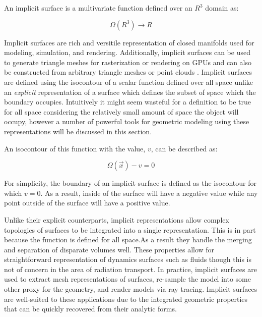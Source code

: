 \documentclass[12pt, a4paper]{article}
\begin{document}
An implicit surface is a multivariate function defined over an $ R^3 $ domain as:

\begin{equation}
    \Omega(R^3)\rightarrow R
\end{equation}


Implicit surfaces are rich and versitile representation of closed manifolds used for modeling, simulation, and rendering. Additionally, implicit surfaces can be used to generate triangle meshes for rasterization or rendering on GPUs \cite{Sethian_1996} and can also be constructed from arbitrary triangle meshes or point clouds \cite{Sigg_2006}. Implicit surfaces are defined using the isocontour of a scalar function defined over all space unlike an \textit{explicit} representation of a surface which defines the subset of space which the boundary occupies. Intuitively it might seem wasteful for a definition to be true for all space considering the relatively small amount of space the object will occupy, however a number of powerful tools for geometric modeling using these representations will be discussed in this section.

An isocontour of this function with the value, $v$, can be described as:

\begin{equation}
  \Omega(\vec{x}) - v  = 0 
\end{equation}

For simplicity, the boundary of an implicit surface is defined as the isocontour for which $v=0$. As a result, inside of the surface will have a negative value while any point outside of the surface will have a positive value.

Unlike their explicit counterparts, implicit representations allow complex topologies of surfaces to be integrated into a single representation. This is in part because the function is defined for all space.As a result they handle the merging and separation of disparate volumes well. These properties allow for straightforward representation of dynamics surfaces such as fluids though this is not of concern in the area of radiation transport. In practice, implicit surfaces are used to extract mesh representations of surfaces, re-sample the model into some other proxy for the geometry, and render models via ray tracing. Implicit surfaces are well-suited to these applications due to the integrated geometric properties that can be quickly recovered from their analytic forms. 
\end{document}
